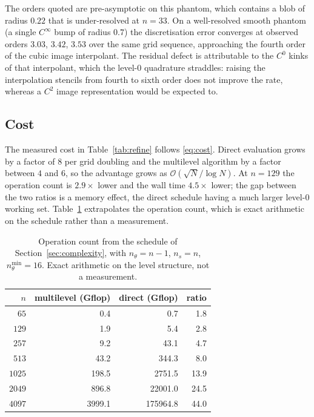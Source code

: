 \documentclass[11pt]{article}
\newcommand{\bigO}{\mathcal{O}}
\begin{document}
The orders quoted are pre-asymptotic on this phantom, which contains a blob of
radius $0.22$ that is under-resolved at $n=33$. On a well-resolved smooth
phantom (a single $C^\infty$ bump of radius $0.7$) the discretisation error
converges at observed orders $3.03$, $3.42$, $3.53$ over the same grid
sequence, approaching the fourth order of the cubic image interpolant. The
residual defect is attributable to the $C^0$ kinks of that interpolant, which
the level-0 quadrature straddles: raising the interpolation stencils from
fourth to sixth order does not improve the rate, whereas a $C^2$ image
representation would be expected to.

\subsection{Cost}

The measured cost in Table~\ref{tab:refine} follows \eqref{eq:cost}. Direct
evaluation grows by a factor of $8$ per grid doubling and the multilevel
algorithm by a factor between $4$ and $6$, so the advantage grows as
$\bigO(\sqrt{N}/\log N)$. At $n=129$ the operation count is $2.9\times$ lower
and the wall time $4.5\times$ lower; the gap between the two ratios is a memory
effect, the direct schedule having a much larger level-0 working set.
Table~\ref{tab:model} extrapolates the operation count, which is exact
arithmetic on the schedule rather than a measurement.

\begin{table}[t]
\centering\small
\caption{Operation count from the schedule of Section~\ref{sec:complexity},
with $n_\theta=n-1$, $n_s=n$, $n_\theta^{\min}=16$. Exact arithmetic on the
level structure, not a measurement.}
\label{tab:model}
\begin{tabular}{rrrr}
\toprule
$n$ & multilevel (Gflop) & direct (Gflop) & ratio\\
\midrule
$65$ & 0.4 & 0.7 & 1.8 \\
$129$ & 1.9 & 5.4 & 2.8 \\
$257$ & 9.2 & 43.1 & 4.7 \\
$513$ & 43.2 & 344.3 & 8.0 \\
$1025$ & 198.5 & 2751.5 & 13.9 \\
$2049$ & 896.8 & 22001.0 & 24.5 \\
$4097$ & 3999.1 & 175964.8 & 44.0 \\
\bottomrule
\end{tabular}
\end{table}
\end{document}
